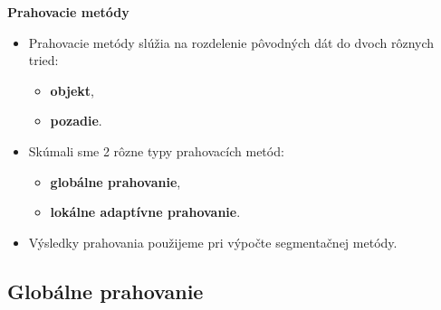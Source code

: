 \documentclass{beamer}
\begin{document}
\begin{frame}{\textbf{Prahovacie metódy}}
	\begin{itemize}
	\item Prahovacie metódy slúžia na rozdelenie pôvodných dát do dvoch rôznych tried:
		\begin{itemize}
			\item \textbf{objekt},
			\item \textbf{pozadie}.
		\end{itemize}
	\vspace{2mm}
	\item Skúmali sme 2 rôzne typy prahovacích metód:
	\begin{itemize}
			\item \textbf{globálne prahovanie},
			\item \textbf{lokálne adaptívne prahovanie}.
		\end{itemize}
	\vspace{2mm}
	\item Výsledky prahovania použijeme pri výpočte segmentačnej metódy.
	\end{itemize}
\end{frame}

\subsection{Globálne prahovanie}

\end{document}
